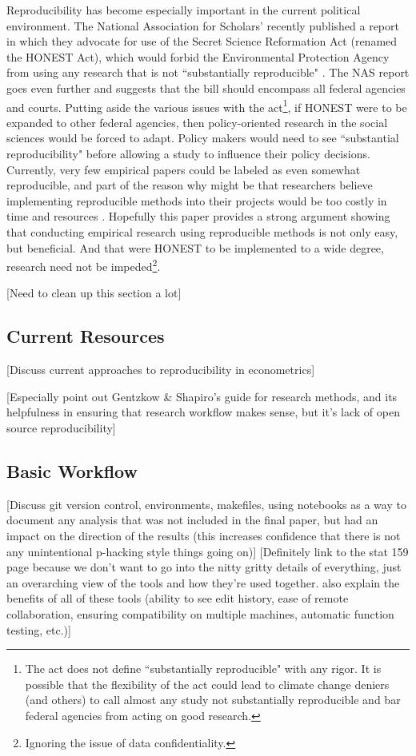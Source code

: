 \documentclass[12pt]{article}
\begin{document}
Reproducibility has become especially important in the current political environment. The National Association for Scholars' recently published a report in which they advocate for use of the Secret Science Reformation Act (renamed the HONEST Act), which would forbid the Environmental Protection Agency from using any research that is not ``substantially reproducible" \cite{wired}. The NAS report goes even further and suggests that the bill should encompass all federal agencies and courts. Putting aside the various issues with the act\footnote{The act does not define ``substantially reproducible" with any rigor. It is possible that the flexibility of the act could lead to climate change deniers (and others) to call almost any study not substantially reproducible and bar federal agencies from acting on good research.}, if HONEST were to be expanded to other federal agencies, then policy-oriented research in the social sciences would be forced to adapt. Policy makers would need to see ``substantial reproducibility" before allowing a study to influence their policy decisions. Currently, very few empirical papers could be labeled as even somewhat reproducible, and part of the reason why might be that researchers believe implementing reproducible methods into their projects would be too costly in time and resources \cite{irreproducible}. Hopefully this paper provides a strong argument showing that conducting empirical research using reproducible methods is not only easy, but beneficial. And that were HONEST to be implemented to a wide degree, research need not be impeded\footnote{Ignoring the issue of data confidentiality.}.


\textcolor{BrickRed}{[Need to clean up this section a lot]}

\subsection{Current Resources}
\textcolor{BrickRed}{[Discuss current approaches to reproducibility in econometrics]}

\textcolor{BrickRed}{[Especially point out Gentzkow \& Shapiro's guide for research methods, and its helpfulness in ensuring that research workflow makes sense, but it's lack of open source reproducibility]}

\subsection{Basic Workflow}
\textcolor{BrickRed}{[Discuss git version control, environments, makefiles, using notebooks as a way to document any analysis that was not included in the final paper, but had an impact on the direction of the results (this increases confidence that there is not any unintentional p-hacking style things going on)]}
\textcolor{BrickRed}{[Definitely link to the stat 159 page because we don't want to go into the nitty gritty details of everything, just an overarching view of the tools and how they're used together. also explain the benefits of all of these tools (ability to see edit history, ease of remote collaboration, ensuring compatibility on multiple machines, automatic function testing, etc.)]}
\end{document}
